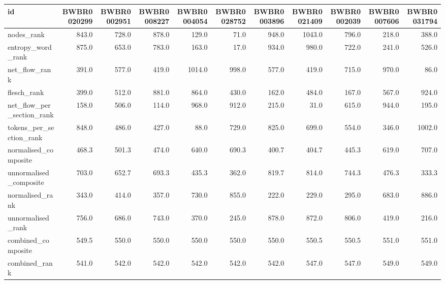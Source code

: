 \begin{tabular}{lrrrrrrrrrr}
\toprule
id & BWBR0020299 & BWBR0002951 & BWBR0008227 & BWBR0004054 & BWBR0028752 & BWBR0003896 & BWBR0021409 & BWBR0002039 & BWBR0007606 & BWBR0031794 \\
\midrule
nodes\_rank & 843.0 & 728.0 & 878.0 & 129.0 & 71.0 & 948.0 & 1043.0 & 796.0 & 218.0 & 388.0 \\
\cline{1-11}
entropy\_word\_rank & 875.0 & 653.0 & 783.0 & 163.0 & 17.0 & 934.0 & 980.0 & 722.0 & 241.0 & 526.0 \\
\cline{1-11}
net\_flow\_rank & 391.0 & 577.0 & 419.0 & 1014.0 & 998.0 & 577.0 & 419.0 & 715.0 & 970.0 & 86.0 \\
\cline{1-11}
flesch\_rank & 399.0 & 512.0 & 881.0 & 864.0 & 430.0 & 162.0 & 484.0 & 167.0 & 567.0 & 924.0 \\
\cline{1-11}
net\_flow\_per\_section\_rank & 158.0 & 506.0 & 114.0 & 968.0 & 912.0 & 215.0 & 31.0 & 615.0 & 944.0 & 195.0 \\
\cline{1-11}
tokens\_per\_section\_rank & 848.0 & 486.0 & 427.0 & 88.0 & 729.0 & 825.0 & 699.0 & 554.0 & 346.0 & 1002.0 \\
\cline{1-11}
normalised\_composite & 468.3 & 501.3 & 474.0 & 640.0 & 690.3 & 400.7 & 404.7 & 445.3 & 619.0 & 707.0 \\
\cline{1-11}
unnormalised\_composite & 703.0 & 652.7 & 693.3 & 435.3 & 362.0 & 819.7 & 814.0 & 744.3 & 476.3 & 333.3 \\
\cline{1-11}
normalised\_rank & 343.0 & 414.0 & 357.0 & 730.0 & 855.0 & 222.0 & 229.0 & 295.0 & 683.0 & 886.0 \\
\cline{1-11}
unnormalised\_rank & 756.0 & 686.0 & 743.0 & 370.0 & 245.0 & 878.0 & 872.0 & 806.0 & 419.0 & 216.0 \\
\cline{1-11}
combined\_composite & 549.5 & 550.0 & 550.0 & 550.0 & 550.0 & 550.0 & 550.5 & 550.5 & 551.0 & 551.0 \\
\cline{1-11}
combined\_rank & 541.0 & 542.0 & 542.0 & 542.0 & 542.0 & 542.0 & 547.0 & 547.0 & 549.0 & 549.0 \\
\cline{1-11}
\bottomrule
\end{tabular}
